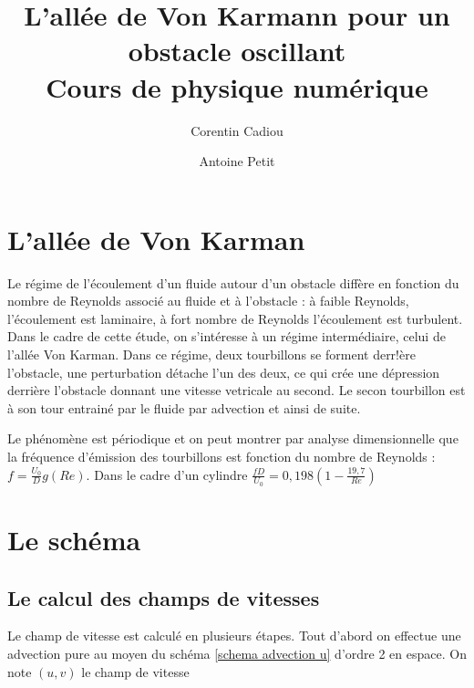 
\title{L'allée de Von Karmann pour un obstacle oscillant\\
Cours de physique numérique}

\author{Corentin Cadiou \and Antoine Petit}
\date{}



\maketitle

\tableofcontents

\section{L'allée de Von Karman}
	
	Le régime de l'écoulement d'un fluide autour d'un obstacle diffère en fonction du nombre de Reynolds associé au fluide et à l'obstacle : à faible Reynolds, l'écoulement est laminaire, à fort nombre de Reynolds l'écoulement est turbulent. Dans le cadre de cette étude, on s'intéresse à un régime intermédiaire, celui de l'allée Von Karman. Dans ce régime, deux tourbillons se forment derr!ère l'obstacle, une perturbation détache l'un des deux, ce qui crée une dépression derrière l'obstacle donnant une vitesse vetricale au second. Le secon tourbillon est à son tour entrainé par le fluide par advection et ainsi de suite.
	
	
	Le phénomène est périodique et on peut montrer par analyse dimensionnelle que la fréquence d'émission des tourbillons est fonction du nombre de Reynolds : $f = \frac{U_0}{D}g(Re)$. Dans le cadre d'un cylindre $\frac{fD}{U_0}=0,198\left (1-\frac{19,7}{Re}\right )$ \cite{Von_Karman}
	
	
	
	

\section{Le schéma}

	\subsection{Le calcul des champs de vitesses}
		
		Le champ de vitesse est calculé en plusieurs étapes. Tout d'abord on effectue une advection pure au moyen du schéma \eqref{schema advection u} d'ordre 2 en espace. On note $(u,v)$ le champ de vitesse
		

